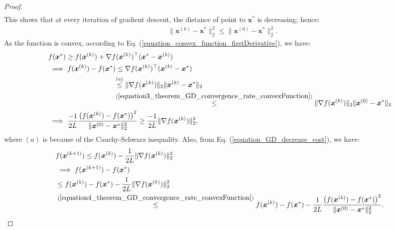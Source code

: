 \documentclass[lang=cn,10pt]{gorgeousnbook}
\numberwithin{equation}{section}%
\numberwithin{figure}{section}%
\begin{document}
\begin{proof}
\begin{align*}
  \end{align*}
  This shows that at every iteration of gradient descent, the distance of point to $\boldsymbol{x}^*$ is decreasing; hence:
  \begin{align}\label{equation3_theorem_GD_convergence_rate_convexFunction}
  &\|\boldsymbol{x}^{(k)} - \boldsymbol{x}^*\|_2^2 \leq \|\boldsymbol{x}^{(0)} - \boldsymbol{x}^*\|_2^2.
  \end{align}
  As the function is convex, according to Eq. (\ref{equation_convex_function_firstDerivative}), we have:
  \begin{align}
  &f(\boldsymbol{x}^*) \geq f(\boldsymbol{x}^{(k)}) + \nabla f(\boldsymbol{x}^{(k)})^\top (\boldsymbol{x}^* - \boldsymbol{x}^{(k)}) \nonumber\\
  &\implies f(\boldsymbol{x}^{(k)}) - f(\boldsymbol{x}^*) \leq \nabla f(\boldsymbol{x}^{(k)})^\top (\boldsymbol{x}^{(k)} - \boldsymbol{x}^*) \nonumber\\
  &~~~~~~~~~~~~~~~~~~~~~~~~~~~~\overset{(a)}{\leq} \|\nabla f(\boldsymbol{x}^{(k)})\|_2 \|\boldsymbol{x}^{(k)} - \boldsymbol{x}^*\|_2 \nonumber\\
  &~~~~~~~~~~~~~~~~~~~~~~~~~~~~\overset{(\ref{equation3_theorem_GD_convergence_rate_convexFunction})}{\leq} \|\nabla f(\boldsymbol{x}^{(k)})\|_2 \|\boldsymbol{x}^{(0)} - \boldsymbol{x}^*\|_2 \nonumber\\
  &\implies \frac{-1}{2L} \frac{\big(f(\boldsymbol{x}^{(k)}) - f(\boldsymbol{x}^*)\big)^2}{\|\boldsymbol{x}^{(0)} - \boldsymbol{x}^*\|_2^2} \geq \frac{-1}{2L} \|\nabla f(\boldsymbol{x}^{(k)})\|_2^2, \label{equation4_theorem_GD_convergence_rate_convexFunction}
  \end{align}
  where $(a)$ is because of the Cauchy-Schwarz inequality. 
  Also, from Eq. (\ref{equation_GD_decrease_cost}), we have:
  \begin{align}
  &f(\boldsymbol{x}^{(k+1)}) \leq f(\boldsymbol{x}^{(k)}) -\frac{1}{2L}\|\nabla f(\boldsymbol{x}^{(k)})\|_2^2 \nonumber\\
  &\implies f(\boldsymbol{x}^{(k+1)}) - f(\boldsymbol{x}^*) \nonumber\\
  &\leq f(\boldsymbol{x}^{(k)}) - f(\boldsymbol{x}^*) -\frac{1}{2L}\|\nabla f(\boldsymbol{x}^{(k)})\|_2^2 \nonumber\\
  &\overset{(\ref{equation4_theorem_GD_convergence_rate_convexFunction})}{\leq} f(\boldsymbol{x}^{(k)}) - f(\boldsymbol{x}^*) - \frac{1}{2L} \frac{\big(f(\boldsymbol{x}^{(k)}) - f(\boldsymbol{x}^*)\big)^2}{\|\boldsymbol{x}^{(0)} - \boldsymbol{x}^*\|_2^2}. \label{equation5_theorem_GD_convergence_rate_convexFunction}

\end{align}
\end{proof}
\end{document}
